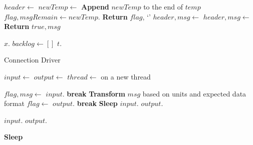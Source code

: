 \documentclass[journal]{IEEEtran}
\begin{document}
\begin{appendices}
\begin{algorithm}[H]
\begin{algorithmic}[1]
		\EndIf
		\State $header \gets $
			\State $newTemp \gets$ 
			\State \textbf{Append} $newTemp$ to the end of $temp$
			\State $flag, msgRemain \gets newTemp.$
				\State \textbf{Return} $flag$, `'
			\EndIf
			\State $header, msg \gets $
		\Else
			\State $header, msg \gets $
		\EndIf
		\State \textbf{Return} $true, msg$
	\EndClassMethod
	\item[]
		\State $x.$
		\State $backlog \gets []$
			\State $t.$
		\EndFor
	\EndClassMethod
	\item[]
    \EndClass
    \end{algorithmic}
\end{algorithm}
%

\begin{algorithm}[H]
    \caption{Connection Driver}
    \label{alg:conn}
    \begin{algorithmic}[1]
    	\State $input \gets$ 
    	\State $output \gets$ 
	\State $thread \gets$  on a new thread
	\item[]
			\State $flag, msg \gets$ $input.$
			 \State \textbf{break} \EndIf
				\State \textbf{Transform} $msg$ based on units and expected data format
				\State $flag \gets$ $output.$
				 \State \textbf{break} \EndIf
			\Else
				\State \textbf{Sleep}
			\EndIf
		\EndWhile
		\State $input.$
		\State $output.$
	\EndClassMethod
	\item[]
		\State $input.$
		\State $output.$
	\EndClassMethod
	\item[]
			\State \textbf{Sleep}
		\EndWhile
		\State {}
	\EndClassMethod
	\item[]
    \EndClass
    \end{algorithmic}
\end{algorithm}

\end{appendices}
\end{document}
